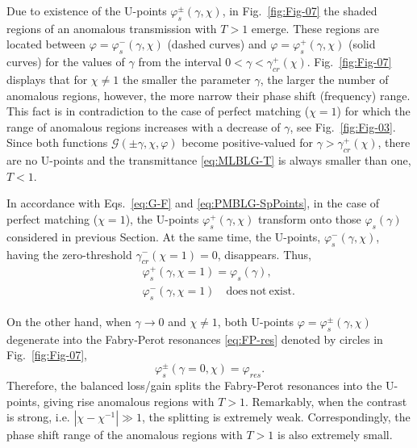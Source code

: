 \documentclass[aps,pra,reprint,showpacs,bibnotes,preprintnumbers,twoside,eqsecnum]{revtex4-1}
\begin{document}
Due to existence of the U-points $\varphi_s^{\pm}(\gamma,\chi)$, in Fig.~\ref{fig:Fig-07} the shaded regions of an anomalous transmission with $T>1$ emerge. These regions are located between $\varphi=\varphi_s^{-}(\gamma,\chi)$ (dashed curves) and $\varphi=\varphi_s^{+}(\gamma,\chi)$ (solid curves) for the values of $\gamma$ from the interval $0<\gamma<\gamma_{cr}^{+}(\chi)$. Fig.~\ref{fig:Fig-07} displays that for $\chi\neq1$ the smaller the parameter $\gamma$, the larger the number of anomalous regions, however, the more narrow their phase shift (frequency) range. This fact is in contradiction to the case of perfect matching ($\chi=1$) for which the range of anomalous regions increases with a decrease of $\gamma$, see Fig.~\ref{fig:Fig-03}. Since both functions $\mathcal{G}(\pm\gamma,\chi,\varphi)$ become positive-valued for $\gamma>\gamma_{cr}^{+}(\chi)$, there are no U-points and the transmittance \eqref{eq:MLBLG-T} is always smaller than one, $T<1$.

In accordance with Eqs.~\eqref{eq:G-F} and \eqref{eq:PMBLG-SpPoints}, in the case of perfect matching ($\chi=1$), the U-points $\varphi_s^{+}(\gamma,\chi)$ transform onto those $\varphi_s(\gamma)$ considered in previous Section. At the same time, the U-points, $\varphi_s^-(\gamma,\chi)$, having the zero-threshold $\gamma_{cr}^{-}(\chi=1)=0$, disappears. Thus,
%
\begin{subequations}\label{eq:MLBLG-phi-matching}
\begin{eqnarray}
&&\varphi_s^{+}(\gamma,\chi=1)=\varphi_s(\gamma),\\
&&\varphi_s^{-}(\gamma,\chi=1)\quad\mathrm{does\ not\ exist}.
\end{eqnarray}
\end{subequations}

On the other hand, when $\gamma\to0$ and $\chi\neq1$, both U-points $\varphi=\varphi_s^{\pm}(\gamma,\chi)$ degenerate into the Fabry-Perot resonances \eqref{eq:FP-res} denoted by circles in Fig.~\ref{fig:Fig-07},
%
\begin{equation}
\varphi_s^{\pm}(\gamma=0,\chi)=\varphi_{res}.
\end{equation}
Therefore, the balanced loss/gain splits the Fabry-Perot resonances into the U-points, giving rise anomalous regions with $T>1$. Remarkably, when the contrast is strong, i.e. $|\chi-\chi^{-1}|\gg1$, the splitting is extremely weak. Correspondingly, the phase shift range of the anomalous regions with $T>1$ is also extremely small.
\end{document}
